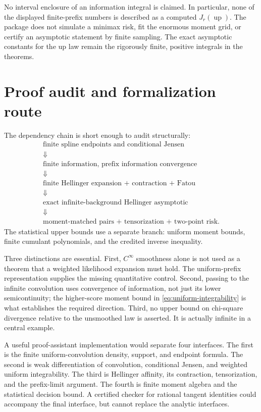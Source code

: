 \documentclass[11pt,a4paper]{article}
\numberwithin{equation}{section}
\theoremstyle{definition}
\theoremstyle{remark}
\newcommand{\up}{\operatorname{up}}
\begin{document}
No interval enclosure of an information integral is claimed. In particular,
none of the displayed finite-prefix numbers is described as a computed
$J_r(\up)$. The package does not simulate a minimax risk, fit the enormous
moment grid, or certify an asymptotic statement by finite sampling.
The exact asymptotic constants for the up law remain the rigorously finite,
positive integrals in the theorems.

\section{Proof audit and formalization route}
\label{sec:audit}

The dependency chain is short enough to audit structurally:
\[
 \begin{gathered}
 \text{finite spline endpoints and conditional Jensen}\\
 \Downarrow\\
 \text{finite information, prefix information convergence}\\
 \Downarrow\\
 \text{finite Hellinger expansion + contraction + Fatou}\\
 \Downarrow\\
 \text{exact infinite-background Hellinger asymptotic}\\
 \Downarrow\\
 \text{moment-matched pairs + tensorization + two-point risk}.
 \end{gathered}
\]
The statistical upper bounds use a separate branch: uniform moment bounds,
finite cumulant polynomials, and the credited inverse inequality.

Three distinctions are essential. First, $C^\infty$ smoothness alone is
not used as a theorem that a weighted likelihood expansion must hold.
The uniform-prefix representation supplies the missing quantitative control.
Second, passing to the infinite convolution uses convergence of information,
not just its lower semicontinuity; the higher-score moment bound in
\eqref{eq:uniform-integrability} is what establishes the required direction.
Third, no upper bound on chi-square divergence relative to the unsmoothed
law is asserted. It is actually infinite in a central example.

A useful proof-assistant implementation would separate four interfaces.
The first is the finite uniform-convolution density, support, and endpoint
formula. The second is weak differentiation of convolution, conditional
Jensen, and weighted uniform integrability. The third is Hellinger affinity,
its contraction, tensorization, and the prefix-limit argument. The fourth
is finite moment algebra and the statistical decision bound. A certified
checker for rational tangent identities could accompany the final interface,
but cannot replace the analytic interfaces.
\end{document}
